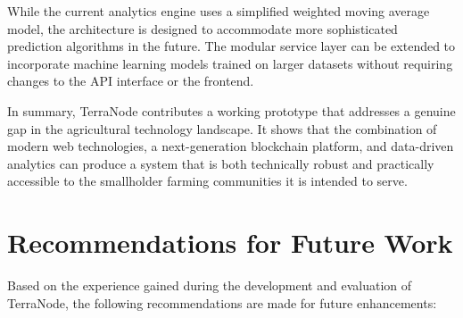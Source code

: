 While the current analytics engine uses a simplified weighted moving average model, the architecture is designed to accommodate more sophisticated prediction algorithms in the future. The modular service layer can be extended to incorporate machine learning models trained on larger datasets without requiring changes to the API interface or the frontend.

In summary, TerraNode contributes a working prototype that addresses a genuine gap in the agricultural technology landscape. It shows that the combination of modern web technologies, a next-generation blockchain platform, and data-driven analytics can produce a system that is both technically robust and practically accessible to the smallholder farming communities it is intended to serve.

\section{Recommendations for Future Work}

Based on the experience gained during the development and evaluation of TerraNode, the following recommendations are made for future enhancements:

